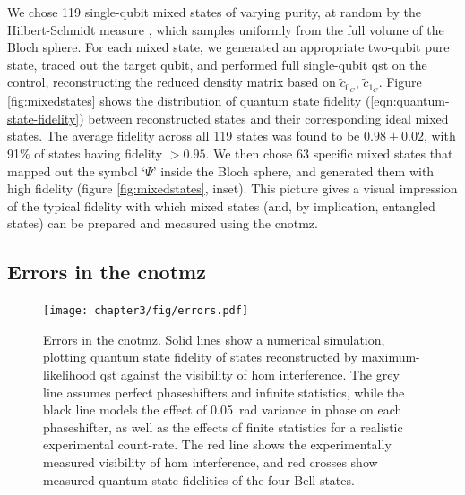 We chose 119 single-qubit mixed states of varying purity, at random by the Hilbert-Schmidt measure \cite{Zyczkowski2001}, which samples uniformly from the full volume of the Bloch sphere.
For each mixed state, we generated an appropriate two-qubit pure state, traced out the target qubit, and performed full single-qubit \gls{qst} on the control, reconstructing the reduced density matrix based on $\tilde{c}_{0_C}$, $\tilde{c}_{1_C}$.
Figure \ref{fig:mixedstates} shows the distribution of quantum state fidelity (\ref{eqn:quantum-state-fidelity}) between reconstructed states and their corresponding ideal mixed states. The average fidelity across all 119 states was found to be $0.98\pm0.02$, with 91\% of states having fidelity $> 0.95 $. We then chose 63 specific mixed states that mapped out the symbol `$\Psi$' inside the Bloch sphere, and generated them with high fidelity (figure \ref{fig:mixedstates}, inset). This picture gives a visual impression of the typical fidelity with which mixed states (and, by implication, entangled states) can be prepared and measured using the \gls{cnotmz}.


\subsection{Errors in the \acrshort{cnotmz}}
\label{sec:cnot-mz-errors}
\begin{figure}[t!]
\centering
\texttt{[image: chapter3/fig/errors.pdf]}
\caption[Errors in the \acrshort{cnotmz}]
{Errors in the \gls{cnotmz}. Solid lines show a numerical simulation, plotting quantum state fidelity of states reconstructed by maximum-likelihood \gls{qst} against the visibility of \gls{hom} interference. The grey line assumes perfect phaseshifters and infinite statistics, while the black line models the effect of \SI{0.05}{\radian} variance in phase on each phaseshifter, as well as the effects of finite statistics for a realistic experimental count-rate. The red line shows the experimentally measured visibility of \gls{hom} interference, and red crosses show measured quantum state fidelities of the four Bell states.}
\label{fig:cnotmz-errors}
\end{figure}

